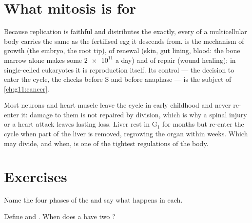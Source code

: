 \section{What mitosis is for}

\begin{proposition}\label{prop:g11:cell-cycle-mitosis:conformity}
Because replication is faithful and  distributes the 
exactly, every  of a multicellular body carries the same  as the fertilised egg it descends from.  is the
mechanism of growth (the embryo, the root tip), of renewal (skin,
gut lining, blood: the bone marrow alone makes some $\num{2e11}$ 
a day) and of repair (wound healing); in single-celled eukaryotes it
is reproduction itself. Its control --- the decision to enter the
cycle, the checks before S and before anaphase --- is the subject of
\cref{ch:g11:cancer}.
\end{proposition}
\admitted

\begin{remark}\label{rem:g11:cell-cycle-mitosis:notall}
Most neurons and heart muscle  leave the cycle in early
childhood and never re-enter it: damage to them is not repaired by
division, which is why a spinal injury or a heart attack leaves lasting
loss. Liver  rest in $\mathrm{G_1}$ for months but re-enter the
cycle when part of the liver is removed, regrowing the organ within
weeks. Which  may divide, and when, is one of the tightest
regulations of the body.
\end{remark}

\section{Exercises}

\begin{exercise}[$\star$]\label{exo:g11:cell-cycle-mitosis:1}
Name the four phases of the  and say what happens in each.
\end{exercise}

\begin{exercise}[$\star$]\label{exo:g11:cell-cycle-mitosis:2}
Define  and . When does a  have two
?
\end{exercise}

